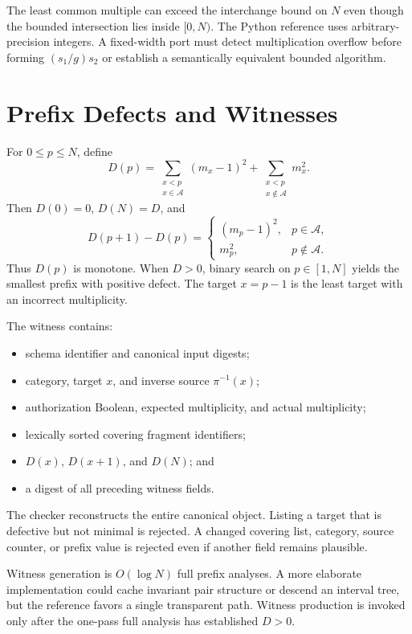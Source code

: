 \documentclass[11pt,onecolumn]{IEEEtran}
\newcommand{\A}{\mathcal A}
\begin{document}
The least common multiple can exceed the interchange bound on $N$ even though the bounded intersection lies inside $[0,N)$.  The Python reference uses arbitrary-precision integers.  A fixed-width port must detect multiplication overflow before forming $(s_1/g)s_2$ or establish a semantically equivalent bounded algorithm.

\section{Prefix Defects and Witnesses}
For $0\leq p\leq N$, define
\begin{equation}
D(p)=\sum_{\substack{x<p\\x\in\A}}(m_x-1)^2+
     \sum_{\substack{x<p\\x\notin\A}}m_x^2.
\end{equation}
Then $D(0)=0$, $D(N)=D$, and
\begin{equation}
 D(p+1)-D(p)=
 \begin{cases}
 (m_p-1)^2,&p\in\A,\\
 m_p^2,&p\notin\A.
 \end{cases}
\end{equation}
Thus $D(p)$ is monotone.  When $D>0$, binary search on $p\in[1,N]$ yields the smallest prefix with positive defect.  The target $x=p-1$ is the least target with an incorrect multiplicity.

The witness contains:
\begin{itemize}
\item schema identifier and canonical input digests;
\item category, target $x$, and inverse source $\pi^{-1}(x)$;
\item authorization Boolean, expected multiplicity, and actual multiplicity;
\item lexically sorted covering fragment identifiers;
\item $D(x)$, $D(x+1)$, and $D(N)$; and
\item a digest of all preceding witness fields.
\end{itemize}
The checker reconstructs the entire canonical object.  Listing a target that is defective but not minimal is rejected.  A changed covering list, category, source counter, or prefix value is rejected even if another field remains plausible.

Witness generation is $O(\log N)$ full prefix analyses.  A more elaborate implementation could cache invariant pair structure or descend an interval tree, but the reference favors a single transparent path.  Witness production is invoked only after the one-pass full analysis has established $D>0$.
\end{document}
